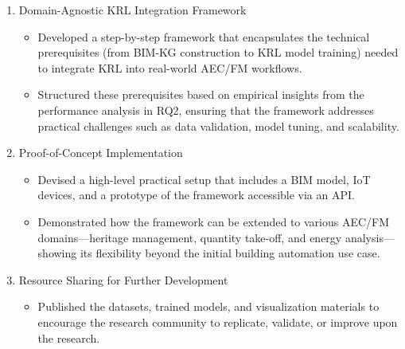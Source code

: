 \begin{enumerate}
\item 
Domain-Agnostic KRL Integration Framework
    \begin{itemize}
    \item 
    Developed a step-by-step framework that encapsulates the technical prerequisites (from \ac{BIM-KG} construction to \ac{KRL} model training) needed to integrate \ac{KRL} into real-world AEC/FM workflows.

    \item 
    Structured these prerequisites based on empirical insights from the performance analysis in RQ2, ensuring that the framework addresses practical challenges such as data validation, model tuning, and scalability.
    \end{itemize}

\item 
Proof-of-Concept Implementation
    \begin{itemize}
    \item 
    Devised a high-level practical setup that includes a \ac{BIM} model, \ac{IoT} devices, and a prototype of the framework accessible via an \ac{API}.
    \item 
    Demonstrated how the framework can be extended to various \ac{AEC/FM} domains—heritage management, quantity take-off, and energy analysis—showing its flexibility beyond the initial building automation use case.
    \end{itemize} 
\item 
Resource Sharing for Further Development
    \begin{itemize}
    \item 
    Published the datasets, trained models, and visualization materials to encourage the research community to replicate, validate, or improve upon the research.
    \end{itemize} 
\end{enumerate}


